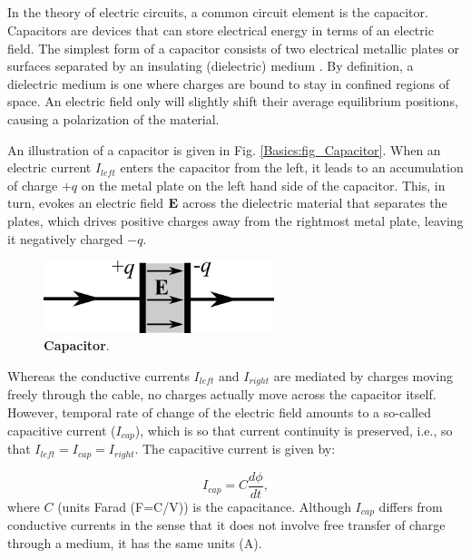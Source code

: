 \subsection{}
In the theory of electric circuits, a common circuit element is the capacitor. Capacitors are devices that can store electrical energy in terms of an electric field. The simplest form of a capacitor consists of two electrical metallic plates or surfaces separated by an insulating (dielectric) medium .  By definition, a dielectric medium is one where charges are bound to stay in confined regions of space. An electric field only will slightly shift their average equilibrium positions, causing a polarization of the material.

An illustration of a capacitor is given in Fig. \ref{Basics:fig_Capacitor}. When an electric current $I_{left}$ enters the capacitor from the left, it leads to an accumulation of charge $+q$ on the metal plate on the left hand side of the capacitor. This, in turn, evokes an electric field $\bf E$ across the dielectric material that separates the plates, which drives positive charges away from the rightmost metal plate, leaving it negatively charged $-q$. 

\begin{figure}[!ht]
\begin{center}
\includegraphics[width=0.6\textwidth]{Figures/Basics/Capacitor.png}
\end{center}
\caption{{\bf Capacitor}.  
}
\label{Basics:fig:Capacitor}
\end{figure}

Whereas the conductive currents $I_{left}$ and $I_{right}$ are mediated by charges moving freely through the cable, no charges actually move across the capacitor itself. However, temporal rate of change of the electric field amounts to a so-called capacitive current  ($I_{cap}$), which is so that current continuity is preserved, i.e., so that $I_{left} = I_{cap} = I_{right}$. The capacitive current is given by: 

\begin{equation}
I_{cap} = C\frac{d\phi}{dt}, 
\label{Basics:eq:Icap}
\end{equation}
where $C$ (units Farad (F=C/V)) is the capacitance. Although $I_{cap}$ differs from conductive currents in the sense that it does not involve free transfer of charge through a medium, it has the same units (A). 

